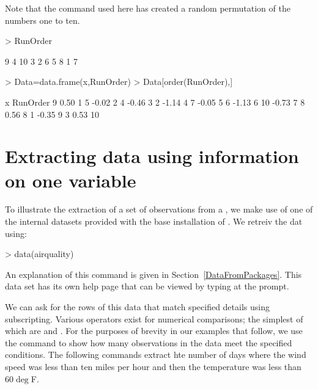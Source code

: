  
Note that the  command used here has created a random permutation of the numbers one to ten. 

\begin{Schunk}
\begin{Sinput}
> RunOrder 
\end{Sinput}
\begin{Soutput}
 [1]  9  4 10  3  2  6  5  8  1  7
\end{Soutput}
\begin{Sinput}
> Data=data.frame(x,RunOrder) 
> Data[order(RunOrder),] 
\end{Sinput}
\begin{Soutput}
       x RunOrder
9   0.50        1
5  -0.02        2
4  -0.46        3
2  -1.14        4
7  -0.05        5
6  -1.13        6
10 -0.73        7
8   0.56        8
1  -0.35        9
3   0.53       10
\end{Soutput}
\end{Schunk}

 
\section{Extracting data using information on one variable} 
 
 
To illustrate the extraction of a set of observations from a , we make use of one of the internal datasets provided with the base installation of \R{}. We retreiv the  dat using: 

\begin{Schunk}
\begin{Sinput}
> data(airquality) 
\end{Sinput}
\end{Schunk}

An explanation of this command is given in Section~\ref{DataFromPackages}. This data set has its own help page that can be viewed by typing  at the \R{} prompt. 
 
 
We can ask for the rows of this data that match specified details using subscripting. Various operators exist for numerical comparisons; the simplest of which are \Roperator{<} and  \Roperator{>}. 
For the purposes of brevity in our examples that follow, we use the  command to show how many observations in the data meet the specified conditions. The following commands extract hte number of days where the wind speed was less than ten miles per hour and then the temperature was less than $60\deg$F. 

